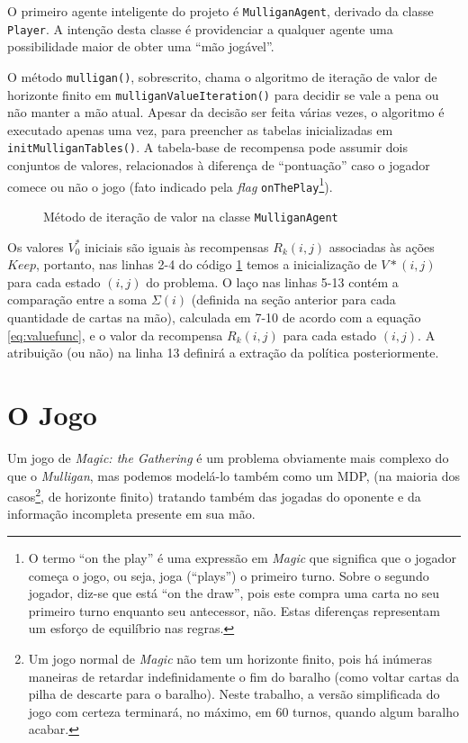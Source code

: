 O primeiro agente inteligente do projeto é \texttt{MulliganAgent}, derivado da classe \texttt{Player}. A intenção desta classe é providenciar a qualquer agente uma possibilidade maior de obter uma ``mão jogável''.



O método \texttt{mulligan()}, sobrescrito, chama o algoritmo de iteração de valor de horizonte finito em \texttt{mulliganValueIteration()} para decidir se vale a pena ou não manter a mão atual. Apesar da decisão ser feita várias vezes, o algoritmo é executado apenas uma vez, para preencher as tabelas inicializadas em \texttt{initMulliganTables()}. A tabela-base de recompensa pode assumir dois conjuntos de valores, relacionados à diferença de ``pontuação'' caso o jogador comece ou não o jogo (fato indicado pela \textit{flag} \texttt{onThePlay}\footnote{O termo ``on the play'' é uma expressão em \textit{Magic} que significa que o jogador começa o jogo, ou seja, joga (``plays'') o primeiro turno. Sobre o segundo jogador, diz-se que está ``on the draw'', pois este compra uma carta no seu primeiro turno enquanto seu antecessor, não. Estas diferenças representam um esforço de equilíbrio nas regras.}).
\begin{figure}[h!]
  
  \label{code:valueit}
  \caption{Método de iteração de valor na classe \texttt{MulliganAgent}}
\end{figure}

Os valores $V^*_0$ iniciais são iguais às recompensas $R_k(i,j)$ associadas às ações $Keep$, portanto, nas linhas 2-4 do código \ref{code:valueit} temos a inicialização de $V*(i, j)$ para cada estado $(i, j)$ do problema. O laço nas linhas 5-13 contém a comparação entre a soma $\Sigma(i)$ (definida na seção anterior para cada quantidade de cartas na mão), calculada em 7-10 de acordo com a equação \ref{eq:valuefunc}, e o valor da recompensa $R_k(i, j)$ para cada estado $(i, j)$. A atribuição (ou não) na linha 13 definirá a extração da política posteriormente.

\newpage

\section{O Jogo}

Um jogo de \textit{Magic: the Gathering} é um problema obviamente mais complexo do que o \textit{Mulligan}, mas podemos modelá-lo também como um MDP,
(na maioria dos casos\footnote{Um jogo normal de \textit{Magic} não tem um horizonte finito, pois há
inúmeras maneiras de retardar indefinidamente o fim do baralho (como voltar cartas da pilha de descarte para o baralho). Neste trabalho, a versão
simplificada do jogo com certeza terminará, no máximo, em 60 turnos, quando algum baralho acabar.}, de horizonte finito) tratando também das jogadas do oponente e da informação incompleta presente em sua mão.

